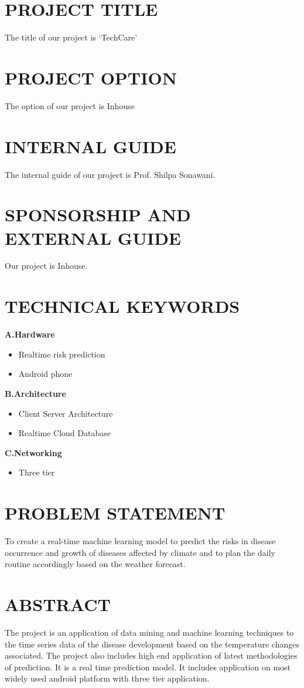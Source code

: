 \documentclass[12pt,a4paper]{report}
\begin{document}
\newpage
\section{PROJECT TITLE}
The title of our project is `TechCare'

\section{PROJECT OPTION}
The option of our project is Inhouse

\section{INTERNAL GUIDE}
The internal guide of our project is  Prof. Shilpa Sonawani.

\section{SPONSORSHIP AND EXTERNAL GUIDE}
Our project is Inhouse.

\section{TECHNICAL KEYWORDS}
\textbf{A.Hardware}
\begin{itemize}
	\item Realtime risk prediction
	\item Android phone
\end{itemize}
\textbf{B.Architecture}
\begin{itemize}
	\item Client Server Architecture
	\item Realtime Cloud Database 
\end{itemize}
\textbf{C.Networking}
\begin{itemize}
	\item Three tier
\end{itemize}


\section{PROBLEM STATEMENT} 
 To create a real-time machine learning model to predict the risks in disease occurrence and growth of diseases affected by climate and to plan the daily routine accordingly based on the weather forecast. 
 
\section{ABSTRACT}
The project is an application of data mining and machine learning techniques to the time series data of the disease development based on the temperature changes associated. The project also includes high end application of latest methodologies of prediction. It is a real time prediction model. It includes application on most widely used android platform with three tier application.
\end{document}
